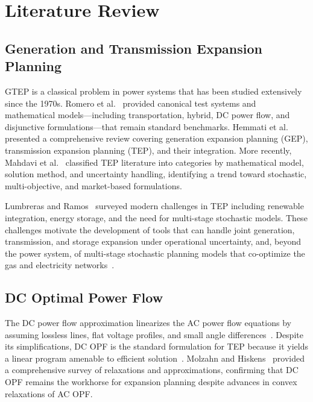 
\section{Literature Review}
\label{sec:literature}

\subsection{Generation and Transmission Expansion Planning}

GTEP is a classical problem in power systems that has been studied
extensively since the 1970s.  Romero et al.~\cite{romero2002test} provided
canonical test systems and mathematical models---including transportation,
hybrid, DC power flow, and disjunctive formulations---that remain standard
benchmarks.  Hemmati et al.~\cite{hemmati2013comprehensive} presented a
comprehensive review covering generation expansion planning (GEP),
transmission expansion planning (TEP), and their integration.  More
recently, Mahdavi et al.~\cite{mahdavi2019tep_survey} classified TEP
literature into categories by mathematical model, solution method, and
uncertainty handling, identifying a trend toward stochastic,
multi-objective, and market-based formulations.

Lumbreras and Ramos~\cite{lumbreras2016progressive} surveyed modern
challenges in TEP including renewable integration, energy storage, and
the need for multi-stage stochastic models.  These challenges motivate
the development of tools that can handle joint generation, transmission,
and storage expansion under operational uncertainty, and, beyond the
power system, of multi-stage stochastic planning models that
co-optimize the gas and electricity networks~\cite{saldarriaga2018phd,
saldarriaga2019stochastic}.

\subsection{DC Optimal Power Flow}

The DC power flow approximation linearizes the AC power flow equations
by assuming lossless lines, flat voltage profiles, and small angle
differences~\cite{stott2009dc_opf}.  Despite its simplifications, DC OPF
is the standard formulation for TEP because it yields a linear program
amenable to efficient solution~\cite{frank2016or_opf}.  Molzahn and
Hiskens~\cite{molzahn2019opf_survey} provided a comprehensive survey of
relaxations and approximations, confirming that DC OPF remains the
workhorse for expansion planning despite advances in convex relaxations
of AC OPF.

